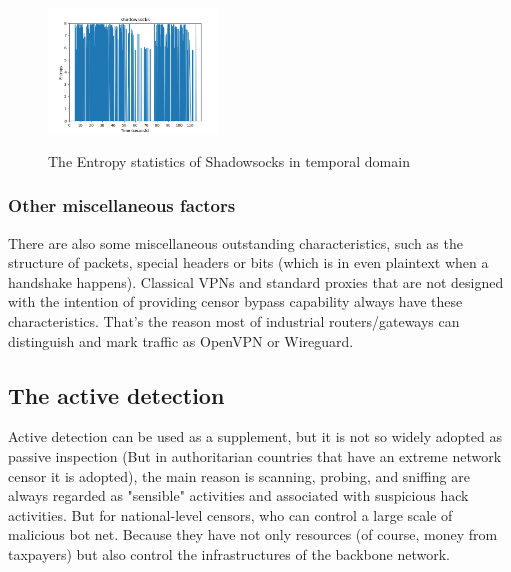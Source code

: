 \documentclass[conference]{IEEEtran}
\begin{document}
\begin{figure}[H]
    \centering
    \includegraphics[width=0.40\textwidth, height=4cm]{pics/temporal_statistic_of_entropy_shadowsocks.png}
    \caption{The Entropy statistics of Shadowsocks in temporal domain}
\end{figure}


\subsubsection{Other miscellaneous factors}
There are also some miscellaneous outstanding characteristics, such as the structure of packets, special headers or bits (which is in even plaintext when a handshake happens). Classical VPNs and standard proxies that are not designed with the intention of providing censor bypass capability always have these characteristics. That's the reason most of industrial routers/gateways can distinguish and mark traffic as OpenVPN or Wireguard.

\subsection{The active detection}\label{sec:active_detection}
Active detection can be used as a supplement, but it is not so widely adopted as passive inspection (But in authoritarian countries that have an extreme network censor it is adopted), the main reason is scanning, probing, and sniffing are always regarded as "sensible" activities and associated with suspicious hack activities. But for national-level censors, who can control a large scale of malicious bot net. Because they have not only resources (of course, money from taxpayers) but also control the infrastructures of the backbone network.
\end{document}
